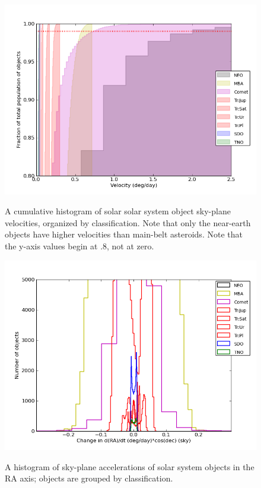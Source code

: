 \documentclass[12pt,preprint]{aastex}
\begin{document}
\begin{figure}[ht!]
  \centering
  \includegraphics[width=13cm]{illustrations/mopsplots/findtracklets_vel1.png}
  \label{velSurvey}
  \caption{A cumulative histogram of solar solar system object
    sky-plane velocities, organized by classification.  Note that only
    the near-earth objects have higher velocities than main-belt
    asteroids.  Note that the y-axis values begin at .8, not at zero.}
\end{figure}

\begin{figure}[ht!]
  \centering
  \includegraphics[width=13cm]{illustrations/mopsplots/hist_accRA_sky2.png}
  \label{raAccSurvey}
  \caption{A histogram of sky-plane accelerations of solar system
    objects in the RA axis; objects are grouped by classification.}
\end{figure}
\end{document}
